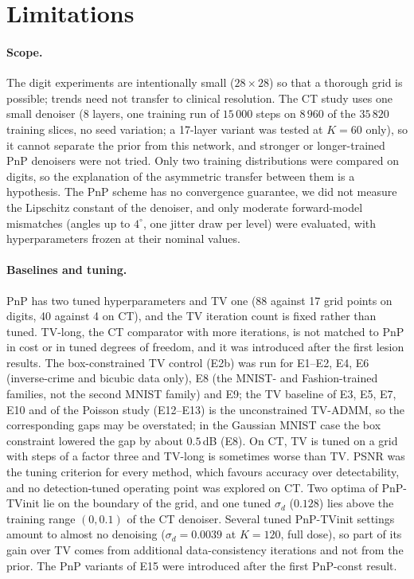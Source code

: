 \section*{Limitations}

\paragraph{Scope.} The digit experiments are intentionally small ($28\times28$) so that a thorough grid is possible; trends need not transfer to clinical resolution. The CT study uses one small denoiser (8 layers, one training run of $15\,000$ steps on $8\,960$ of the $35\,820$ training slices, no seed variation; a 17-layer variant was tested at $K=60$ only), so it cannot separate the prior from this network, and stronger or longer-trained PnP denoisers were not tried. Only two training distributions were compared on digits, so the explanation of the asymmetric transfer between them is a hypothesis. The PnP scheme has no convergence guarantee, we did not measure the Lipschitz constant of the denoiser, and only moderate forward-model mismatches (angles up to $4^\circ$, one jitter draw per level) were evaluated, with hyperparameters frozen at their nominal values.

\paragraph{Baselines and tuning.} PnP has two tuned hyperparameters and TV one (88 against 17 grid points on digits, 40 against 4 on CT), and the TV iteration count is fixed rather than tuned. TV-long, the CT comparator with more iterations, is not matched to PnP in cost or in tuned degrees of freedom, and it was introduced after the first lesion results. The box-constrained TV control (E2b) was run for E1--E2, E4, E6 (inverse-crime and bicubic data only), E8 (the MNIST- and Fashion-trained families, not the second MNIST family) and E9; the TV baseline of E3, E5, E7, E10 and of the Poisson study (E12--E13) is the unconstrained TV-ADMM, so the corresponding gaps may be overstated; in the Gaussian MNIST case the box constraint lowered the gap by about $0.5$\,dB (E8). On CT, TV is tuned on a grid with steps of a factor three and TV-long is sometimes worse than TV. PSNR was the tuning criterion for every method, which favours accuracy over detectability, and no detection-tuned operating point was explored on CT. Two optima of PnP-TVinit lie on the boundary of the grid, and one tuned $\sigma_d$ ($0.128$) lies above the training range $(0,0.1)$ of the CT denoiser. Several tuned PnP-TVinit settings amount to almost no denoising ($\sigma_d=0.0039$ at $K=120$, full dose), so part of its gain over TV comes from additional data-consistency iterations and not from the prior. The PnP variants of E15 were introduced after the first PnP-const result.

